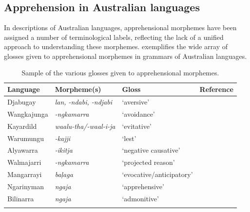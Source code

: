 \documentclass[output=paper,colorlinks,citecolor=brown]{langscibook}
\begin{document}
\subsection{Apprehension in Australian languages}
\label{subsec:auslang}

In descriptions of Australian languages, apprehensional morphemes have been assigned a number of terminological labels, reflecting the lack of a unified approach to understanding these morphemes.  exemplifies the wide array of glosses given to apprehensional morphemes in grammars of Australian languages.



\begin{table}

\caption{Sample of the various glosses given to apprehensional morphemes.}
\label{tab1-bro}
\begin{tabularx}{\textwidth}{lQlQ}
\lsptoprule
Language & Morpheme(s)                                        & Gloss             & Reference \\
\midrule
Djabugay          & \textit{lan, -ndabi, -ndjabi  }          & `aversive'                 & \citep[268]{patz_djabugay_1991}                  \\
\tablevspace
Wangkajunga       & \textit{-ngkamarra}                      & `avoidance'                & \citep[95, 290--291]{jones_grammar_2011}                  \\
\tablevspace
Kayardild         & \textit{waalu-tha/-waal-i-ja  }       & `evitative'                & \citep[173--175]{evans_current_1995}                  \\
\tablevspace
Warumungu         & \textit{-kajji}                          & `lest'                     & \citep[22--23]{simpson_warumungu_1982}                  \\
\tablevspace
Alyawarra         & \textit{-ikitja}                         & `negative causative'       & \citep[69, 75--76]{yallop_alyawarra_1977}                  \\
\tablevspace
Walmajarri        & \textit{-ngkamarra}                      & `projected reason'         & \citep[31]{hudson_core_1978}                  \\
\tablevspace
Mangarrayi        & \textit{ba\d{l}aga}                          & `evocative/anticipatory' & \citep[146--147]{merlan_mangarayi_1989}                  \\
\tablevspace
Ngarinyman        & \textit{ngaja}                           & `apprehensive'             & \citep{angeloschultzeberndt2016}                 \\
\tablevspace
Bilinarra         & \textit{ngaja}                           & `admonitive'               & \citep[305]{meakins_grammar_2014}\\
\lspbottomrule
\end{tabularx}
\end{table}
\end{document}
